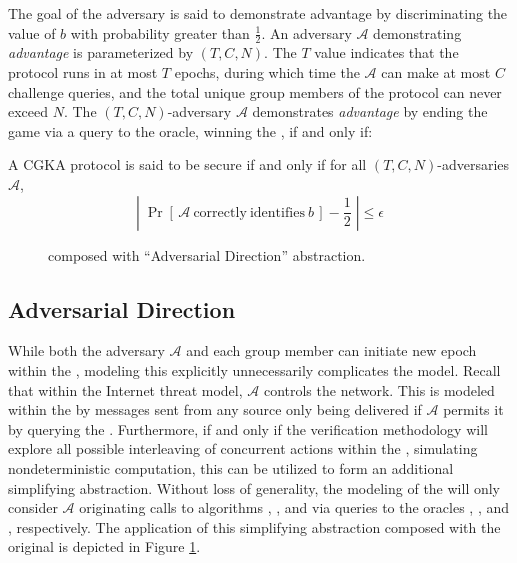 \documentclass[runningheads]{llncs}
\newcommand{\Abrev}[1]{\gls{#1}}
\newcommand{\Adversary}{\ensuremath{\mathcal{A}}\xspace}
\begin{document}
The goal of the adversary is said to demonstrate advantage by discriminating the value of \(b\) with probability greater than \(\frac{1}{2}\).
An adversary \Adversary demonstrating \emph{advantage} is parameterized by \((T, C, N)\).
The \(T\) value indicates that the protocol runs in at most \(T\) epochs, during which time the \(\mathcal{A}\) can make at most \(C\) challenge queries, and the total unique group members of the protocol can never exceed \(N\).
The \((T, C, N)\)-adversary \(\mathcal{A}\) demonstrates \emph{advantage} by ending the game via a query to the  oracle, winning the \CGKAsec, if and only if:

\begin{definition}[Non-adaptive $(T, C, N, \epsilon)$ \Abrev{CGKA} Security]\label{def:CGKA-Security}
A \Abrev{CGKA} protocol is said to be secure if and only if for all $(T, C, N)$-adversaries $\mathcal{A}$,
\[ \left|\; \Pr\left[ \,\mathcal{A}\mathrm{~correctly~identifies~}b\, \right] - \frac{1}{2} \;\right| \leq \epsilon \]
\end{definition}

\begin{figure}
\centering
{}
\caption[Transition graph of informal CGKA definition]{%
\label{fig:CGKA-Direct}%
High-level illustration of the \CGKAsec formalization.\ %
}%
\vfill
{}
\caption[Transition graph of informal CGKA definition]{%
\label{fig:CGKA-Adversarial-Driven}%
\CGKAsec composed with ``Adversarial Direction'' abstraction.%
}%
\end{figure}


\subsection{Adversarial Direction}

While both the adversary \Adversary and each group member can initiate new epoch within the \CGKAsec, modeling this explicitly unnecessarily complicates the model.
Recall that within the Internet threat model, \Adversary controls the network.
This is modeled within the \CGKAsec by messages sent from any source only being delivered if \Adversary permits it by querying the .
Furthermore, if and only if the verification methodology will explore all possible interleaving of concurrent actions within the \CGKAsec, simulating nondeterministic computation, this can be utilized to form an additional simplifying abstraction.
Without loss of generality, the modeling of the \CGKAsec will only consider \Adversary originating calls to algorithms , , and  via queries to the oracles , , and , respectively.
The application of this simplifying abstraction composed with the original \CGKAsec is depicted in Figure \ref{fig:CGKA-Adversarial-Driven}.
\end{document}
